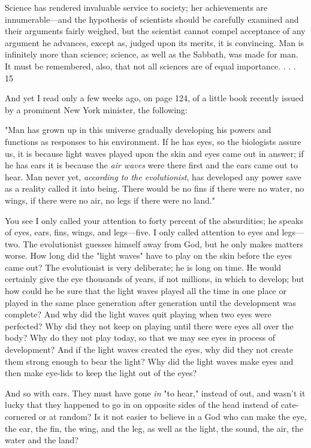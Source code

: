 Science has rendered invaluable service to society; her achievements are innumerable—and
the hypothesis of scientists should be carefully examined and their arguments fairly weighed,
but the scientist cannot compel acceptance of any argument he advances, except as, judged
upon its merits, it is convincing. Man is infinitely more than science; science, as well as the
Sabbath, was made for man. It must be remembered, also, that not all sciences are of equal
importance. . . . 15

And yet I read only a few weeks ago, on page 124, of a little book recently issued by a
prominent New York minister, the following:

"Man has grown up in this universe gradually developing his powers and functions as
responses to his environment. If he has eyes, so the biologists assure us, it is because light
waves played upon the skin and eyes came out in answer; if he has ears it is because the \textit{air
waves} were there first and the ears came out to hear. Man never yet, \textit{according to the
evolutionist}, has developed any power save as a reality called it into being. There would be
no fins if there were no water, no wings, if there were no air, no legs if there were no land."

You see I only called your attention to forty percent of the absurdities; he speaks of eyes,
ears, fins, wings, and legs—five. I only called attention to eyes and legs—two. The
evolutionist guesses himself away from God, but he only makes matters worse. How long did
the "light waves" have to play on the skin before the eyes came out? The evolutionist is very
deliberate; he is long on time. He would certainly give the eye thousands of years, if not
millions, in which to develop; but how could he be sure that the light waves played all the
time in one place or played in the same place generation after generation until the
development was complete? And why did the light waves quit playing when two eyes were
perfected? Why did they not keep on playing until there were eyes all over the body? Why do
they not play today, so that we may see eyes in process of development? And if the light
waves created the eyes, why did they not create them strong enough to bear the light? Why
did the light waves make eyes and then make eye-lids to keep the light out of the eyes?

And so with ears. They must have gone \textit{in} "to hear," instead of out, and wasn't it lucky that
they happened to go in on opposite sides of the head instead of cate-cornered or at random?
Is it not easier to believe in a God who can make the eye, the ear, the fin, the wing, and the
leg, as well as the light, the sound, the air, the water and the land?

